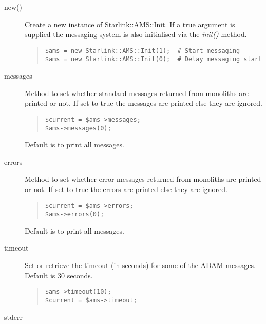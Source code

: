 \documentclass[twoside,11pt]{article}
\newenvironment{myquote}{\begin{quote}\begin{small}}{\end{small}\end{quote}}
\renewcommand{\_}{\texttt{\symbol{95}}}
\begin{document}
\begin{description}

\item[new()] \mbox{}

Create a new instance of Starlink::AMS::Init.
If a true argument is supplied the messaging system is also
initialised via the {\em init()\/} method.

\begin{myquote}
\begin{verbatim}
$ams = new Starlink::AMS::Init(1);  # Start messaging
$ams = new Starlink::AMS::Init(0);  # Delay messaging start
\end{verbatim}
\end{myquote}


\item[messages] \mbox{}

Method to set whether standard messages returned from monoliths
are printed or not. If set to true the messages are printed
else they are ignored.

\begin{myquote}
\begin{verbatim}
$current = $ams->messages;
$ams->messages(0);
\end{verbatim} 
\end{myquote} %

Default is to print all messages.

\item[errors] \mbox{}

Method to set whether error messages returned from monoliths
are printed or not. If set to true the errors are printed
else they are ignored.
\begin{myquote}
\begin{verbatim}
$current = $ams->errors;
$ams->errors(0);
\end{verbatim} 
\end{myquote} %

Default is to print all messages.

\item[timeout] \mbox{}

Set or retrieve the timeout (in seconds) for some of the ADAM messages.
Default is 30 seconds.
\begin{myquote}
\begin{verbatim}
$ams->timeout(10);
$current = $ams->timeout;
\end{verbatim} 
\end{myquote} %

\item[stderr] \mbox{}


\end{description}
\end{document}
